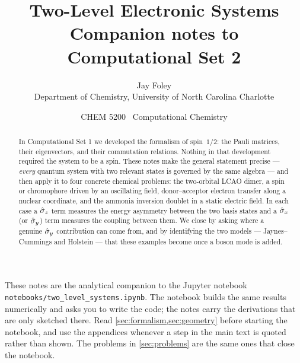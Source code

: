 \documentclass[11pt]{article}
\title{\vspace{-1.2cm}\Large\bfseries Two-Level Electronic Systems\\[2pt]
       \large\normalfont Companion notes to Computational Set 2}
\author{\normalsize Jay Foley\\[-2pt]
        \small Department of Chemistry, University of North Carolina Charlotte}
\date{\small CHEM 5200 \textperiodcentered\ Computational Chemistry}
\begin{document}
\maketitle
\thispagestyle{fancy}

\begin{abstract}
\noindent
\small
In Computational Set 1 we developed the formalism of spin~$1/2$: the Pauli matrices,
their eigenvectors, and their commutation relations. Nothing in that development
required the system to be a spin. These notes make the general statement precise ---
\emph{every} quantum system with two relevant states is governed by the same algebra ---
and then apply it to four concrete chemical problems: the two-orbital LCAO dimer, a
spin or chromophore driven by an oscillating field, donor--acceptor electron transfer
along a nuclear coordinate, and the ammonia inversion doublet in a static electric
field. In each case a $\hat{\sigma}_z$ term measures the energy asymmetry between the two basis
states and a $\hat{\sigma}_x$ (or $\hat{\sigma}_y$) term measures the coupling between them. We close by
asking where a genuine $\hat{\sigma}_y$ contribution can come from, and by identifying the two
models --- Jaynes--Cummings and Holstein --- that these examples become once a boson
mode is added.
\end{abstract}

\vspace{-0.3cm}
\begin{nbbox}
These notes are the analytical companion to the Jupyter notebook
\texttt{notebooks/two\_level\_systems.ipynb}. The notebook builds the same results
numerically and asks you to write the code; the notes carry the derivations that
are only sketched there. Read \cref{sec:formalism,sec:geometry} before starting the
notebook, and use the appendices whenever a step in the main text is quoted
rather than shown. The problems in \cref{sec:problems} are the same ones that close
the notebook.
\end{nbbox}

\vspace{0.2cm}
{\small\tableofcontents}
\clearpage











\appendix



\end{document}
